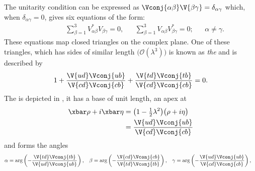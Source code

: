 The unitarity condition can be expressed as
$\Vconj{\alpha\beta}\V{\beta\gamma}=\delta_{\alpha\gamma}$
which, when $\delta_{\alpha\gamma}=0$, gives six equations of the form:
\begin{align}
  \phantom{\beta\neq\gamma}
  &&\sum_{\beta=1}^3V_{\alpha\beta}^*V_{\beta\gamma}^{\phantom{*}} = 0,
  &&\sum_{\beta=1}^3V_{\alpha\beta}^{\phantom{*}}V_{\beta\gamma}^*=0;
  &&\alpha\neq\gamma.
  \label{eq:th:offdiag}
\end{align}
These equations map closed triangles on the complex plane.
One of these triangles, which has sides of similar length
$\big(\mathcal{O}(\lambda^3)\big)$
is known as \emph{the} \ut and is described by
\begin{equation}
  1 + \frac{\V{ud}\Vconj{ub}}{\V{cd}\Vconj{cb}} + \frac{\V{td}\Vconj{tb}}{\V{cd}\Vconj{cb}} = 0.
  \label{eq:th:ut}
\end{equation}
The \ut is depicted in , it has a base of unit length, an apex at
\begin{align}
  \xbar\rho+i\xbar\eta &= \big(1-\tfrac12\lambda^2\big)\big(\rho+i\eta\big)
  \nonumber\\
  &=\frac{\V{ud}\Vconj{ub}}{\V{cd}\Vconj{cb}}
\end{align}
and forms the angles
\begin{align}
  \alpha &= \arg\left(-\frac{\V{td}\Vconj{tb}}{\V{ud}\Vconj{ub}}\right), &
  \beta  &= \arg\left(-\frac{\V{cd}\Vconj{cb}}{\V{td}\Vconj{tb}}\right), &
  \gamma &= \arg\left(-\frac{\V{ud}\Vconj{ub}}{\V{cd}\Vconj{cb}}\right),
\end{align}
